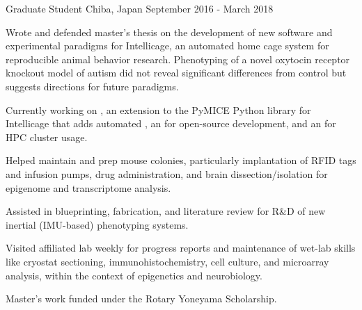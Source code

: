 \begin{cventries}
    {Graduate Student}
    {Chiba, Japan}
    {September 2016 - March 2018}
    {\begin{cvitems}
        \item{
            {Wrote} and 
            {defended} master's thesis on the development of new software and
            experimental paradigms for Intellicage, an automated home cage system for
            reproducible animal behavior research. Phenotyping of a novel oxytocin
            receptor knockout model of autism did not reveal significant differences
            from control but suggests directions for future paradigms.\vspace*{0.1cm}}
        \item{Currently working on , an extension to the
            PyMICE Python library for Intellicage that adds automated , an
             for
            open-source development, and an  for HPC cluster
            usage.\vspace*{0.1cm}}
        \item{Helped maintain and prep mouse colonies, particularly implantation of RFID
            tags and infusion pumps, drug administration, and brain dissection/isolation
            for epigenome and transcriptome analysis.\vspace*{0.1cm}}
        \item{Assisted in blueprinting, fabrication, and literature review for R\&D of
            new inertial (IMU-based) phenotyping systems.\vspace*{0.1cm}}
        \item{Visited 
            {affiliated lab} weekly for progress reports and maintenance of wet-lab
            skills like cryostat sectioning, immunohistochemistry, cell culture, and
            microarray analysis, within the context of epigenetics and
            neurobiology.\vspace*{0.1cm}}
        \item{Master's work funded under the Rotary Yoneyama 
            {Scholarship}.}
    \end{cvitems}}
    \vspace*{0.2cm}
    

\end{cventries}
